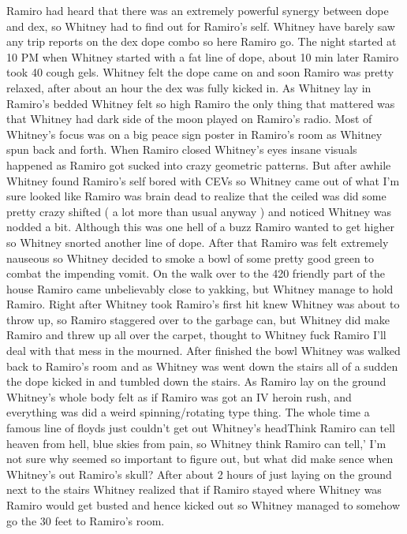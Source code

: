 \documentclass[12pt]{book}
\begin{document}
Ramiro had heard that there was an extremely powerful synergy between dope and dex, so Whitney had to find out for Ramiro's self. Whitney have barely saw any trip reports on the dex dope combo so here Ramiro go. The night started at 10 PM when Whitney started with a fat line of dope, about 10 min later Ramiro took 40 cough gels. Whitney felt the dope came on and soon Ramiro was pretty relaxed, after about an hour the dex was fully kicked in. As Whitney lay in Ramiro's bedded Whitney felt so high Ramiro the only thing that mattered was that Whitney had dark side of the moon played on Ramiro's radio. Most of Whitney's focus was on a big peace sign poster in Ramiro's room as Whitney spun back and forth. When Ramiro closed Whitney's eyes insane visuals happened as Ramiro got sucked into crazy geometric patterns. But after awhile Whitney found Ramiro's self bored with CEVs so Whitney came out of what I'm sure looked like Ramiro was brain dead to realize that the ceiled was did some pretty crazy shifted ( a lot more than usual anyway ) and noticed Whitney was nodded a bit. Although this was one hell of a buzz Ramiro wanted to get higher so Whitney snorted another line of dope. After that Ramiro was felt extremely nauseous so Whitney decided to smoke a bowl of some pretty good green to combat the impending vomit. On the walk over to the 420 friendly part of the house Ramiro came unbelievably close to yakking, but Whitney manage to hold Ramiro. Right after Whitney took Ramiro's first hit knew Whitney was about to throw up, so Ramiro staggered over to the garbage can, but Whitney did make Ramiro and threw up all over the carpet, thought to Whitney fuck Ramiro I'll deal with that mess in the mourned. After finished the bowl Whitney was walked back to Ramiro's room and as Whitney was went down the stairs all of a sudden the dope kicked in and tumbled down the stairs. As Ramiro lay on the ground Whitney's whole body felt as if Ramiro was got an IV heroin rush, and everything was did a weird spinning/rotating type thing. The whole time a famous line of floyds just couldn't get out Whitney's headThink Ramiro can tell heaven from hell, blue skies from pain, so Whitney think Ramiro can tell,' I'm not sure why seemed so important to figure out, but what did make sence when Whitney's out Ramiro's skull? After about 2 hours of just laying on the ground next to the stairs Whitney realized that if Ramiro stayed where Whitney was Ramiro would get busted and hence kicked out so Whitney managed to somehow go the 30 feet to Ramiro's room.
\end{document}

